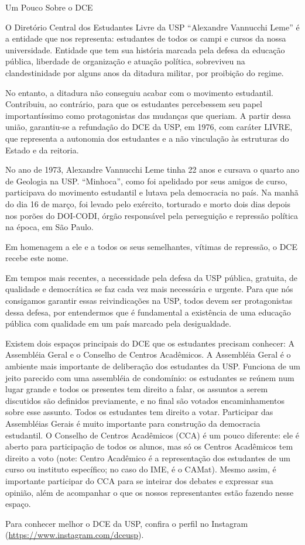 \begin{secao}{Um Pouco Sobre o DCE}

O Diretório Central dos Estudantes Livre da USP ``Alexandre Vannucchi Leme'' é a
entidade que nos representa: estudantes de todos os campi e cursos da nossa universidade.
Entidade que tem sua história marcada pela defesa da educação pública, liberdade
de organização e atuação política, sobreviveu na clandestinidade por alguns anos
da ditadura militar, por proibição do regime.

No entanto, a ditadura não conseguiu acabar com o movimento estudantil. Contribuiu,
ao contrário, para que os estudantes percebessem seu papel importantíssimo como
protagonistas das mudanças que queriam. A partir dessa união, garantiu-se a
refundação do DCE da USP, em 1976, com caráter LIVRE, que representa a autonomia
dos estudantes e a não vinculação às estruturas do Estado e da reitoria.

No ano de 1973, Alexandre Vannucchi Leme tinha 22 anos e cursava o quarto ano
de Geologia na USP. ``Minhoca'', como foi apelidado por seus amigos de curso, participava
do movimento estudantil e lutava pela democracia no país. Na manhã do dia 16 de março,
foi levado pelo exército, torturado e morto dois dias depois nos porões do DOI-CODI,
órgão responsável pela perseguição e repressão política na época, em São Paulo.

Em homenagem a ele e a todos os seus semelhantes, vítimas de repressão, o DCE recebe este nome.

Em tempos mais recentes, a necessidade pela defesa da USP pública, gratuita, de qualidade
e democrática se faz cada vez mais necessária e urgente. Para que nós consigamos
garantir essas reivindicações na USP, todos devem ser protagonistas dessa defesa,
por entendermos que é fundamental a existência de uma educação pública com qualidade
em um país marcado pela desigualdade.

Existem dois espaços principais do DCE que os estudantes precisam conhecer: A Assembléia 
Geral e o Conselho de Centros Acadêmicos.
A Assembléia Geral é o ambiente mais importante de deliberação dos estudantes da USP. Funciona de um
jeito parecido com uma assembléia de condomínio: os estudantes se reúnem num lugar grande e todos os
presentes tem direito a falar, os assuntos a serem discutidos são definidos previamente, e no final
são votados encaminhamentos sobre esse assunto. Todos os estudantes tem direito a votar. Participar das
Assembléias Gerais é muito importante para construção da democracia estudantil.
O Conselho de Centros Acadêmicos (CCA) é um pouco diferente: ele é aberto para participação de todos os alunos,
mas só os Centros Acadêmicos tem direito a voto (note: Centro Acadêmico é a representação dos estudantes de
um curso ou instituto específico; no caso do IME, é o CAMat). Mesmo assim, é importante participar do CCA
para se inteirar dos debates e expressar sua opinião, além de acompanhar o que os nossos representantes 
estão fazendo nesse espaço. 

Para conhecer melhor o DCE da USP, confira o perfil no Instagram (\url{https://www.instagram.com/dceusp}).

\end{secao}

